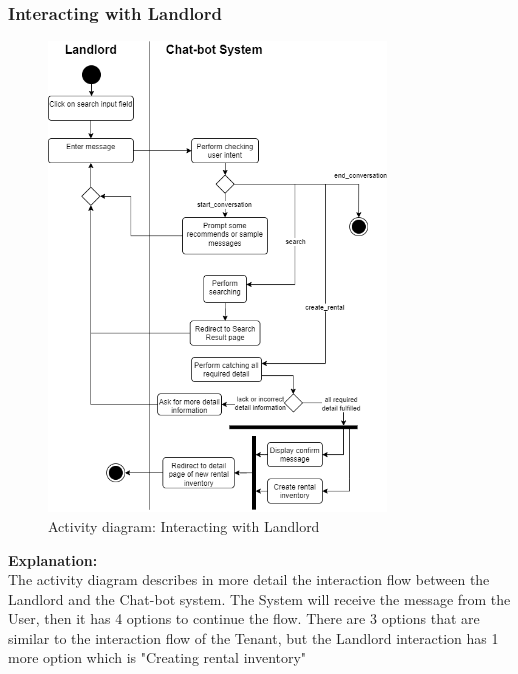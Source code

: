 \newpage
\subsubsection{Interacting with Landlord}
\begin{figure}[H]
    \centering
    \includegraphics[width=0.8\textwidth]{Images/Activity/ac_diag_create_rental_chat_bot.png}
    \caption{Activity diagram: Interacting with Landlord}
    \label{fig:Interacting-with-Landlord}
\end{figure}
\noindent \textbf{Explanation:}\\
The activity diagram describes in more detail the interaction flow between the Landlord and the Chat-bot system. The System will receive the message from the User, then it has 4 options to continue the flow. There are 3 options that are similar to the interaction flow of the Tenant, but the Landlord interaction has 1 more option which is "Creating rental inventory"\\
